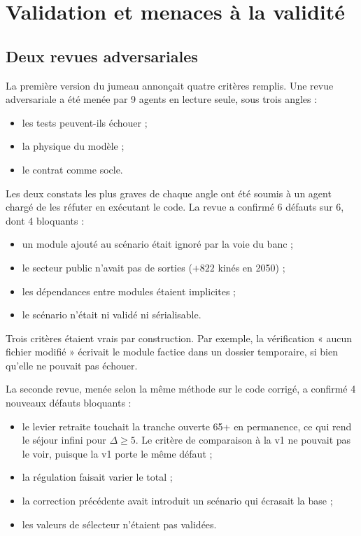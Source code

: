 \documentclass[11pt]{article}
\begin{document}
\section{Validation et menaces à la validité}\label{sec:validation}

\subsection{Deux revues adversariales}
La première version du jumeau annonçait quatre critères remplis. Une revue adversariale a été menée
par 9 agents en lecture seule, sous trois angles :
\begin{itemize}
  \item les tests peuvent-ils échouer ;
  \item la physique du modèle ;
  \item le contrat comme socle.
\end{itemize}
Les deux constats les plus graves de chaque angle ont été soumis à un agent chargé de les réfuter
en exécutant le code. La revue a confirmé 6\mesure{} défauts sur 6, dont 4 bloquants :
\begin{itemize}
  \item un module ajouté au scénario était ignoré par la voie du banc ;
  \item le secteur public n'avait pas de sorties ($+822$\mesure{} kinés en 2050) ;
  \item les dépendances entre modules étaient implicites ;
  \item le scénario n'était ni validé ni sérialisable.
\end{itemize}
Trois critères étaient vrais par construction. Par exemple, la vérification « aucun fichier
modifié » écrivait le module factice dans un dossier temporaire, si bien qu'elle ne pouvait pas
échouer.

La seconde revue, menée selon la même méthode sur le code corrigé, a confirmé 4\mesure{} nouveaux
défauts bloquants :
\begin{itemize}
  \item le levier retraite touchait la tranche ouverte 65+ en permanence, ce qui rend le séjour
        infini pour $\Delta \ge 5$. Le critère de comparaison à la v1 ne pouvait pas le voir, puisque
        la v1 porte le même défaut ;
  \item la régulation faisait varier le total ;
  \item la correction précédente avait introduit un scénario qui écrasait la base ;
  \item les valeurs de sélecteur n'étaient pas validées.
\end{itemize}
\end{document}
